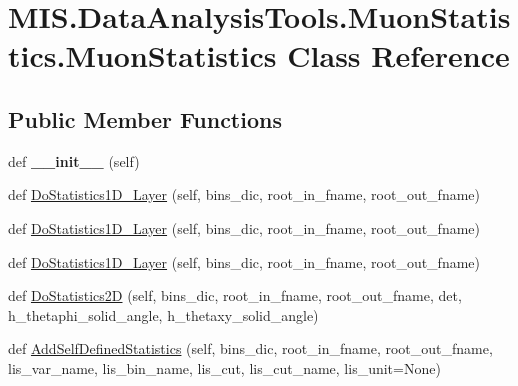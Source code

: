 \hypertarget{classMIS_1_1DataAnalysisTools_1_1MuonStatistics_1_1MuonStatistics}{}\section{M\+I\+S.\+Data\+Analysis\+Tools.\+Muon\+Statistics.\+Muon\+Statistics Class Reference}
\label{classMIS_1_1DataAnalysisTools_1_1MuonStatistics_1_1MuonStatistics}
\subsection*{Public Member Functions}
\begin{DoxyCompactItemize}
\item 
\mbox{\label{classMIS_1_1DataAnalysisTools_1_1MuonStatistics_1_1MuonStatistics_ad3efd45157427c80cd90b920bdd639da}} 
def {\bfseries \+\_\+\+\_\+init\+\_\+\+\_\+} (self)
\item 
def \hyperlink{classMIS_1_1DataAnalysisTools_1_1MuonStatistics_1_1MuonStatistics_abd0a8cd462c3b97c491529d113254d4d}{Do\+Statistics1\+D\+\_\+Layer} (self, bins\+\_\+dic, root\+\_\+in\+\_\+fname, root\+\_\+out\+\_\+fname)
\item 
def \hyperlink{classMIS_1_1DataAnalysisTools_1_1MuonStatistics_1_1MuonStatistics_ac29374f312e07174fdc6483bd686b7ff}{Do\+Statistics1\+D\+\_\+Layer} (self, bins\+\_\+dic, root\+\_\+in\+\_\+fname, root\+\_\+out\+\_\+fname)
\item 
def \hyperlink{classMIS_1_1DataAnalysisTools_1_1MuonStatistics_1_1MuonStatistics_ac06ea60dabb49a569b97e08a18c67ba4}{Do\+Statistics1\+D\+\_\+Layer} (self, bins\+\_\+dic, root\+\_\+in\+\_\+fname, root\+\_\+out\+\_\+fname)
\item 
def \hyperlink{classMIS_1_1DataAnalysisTools_1_1MuonStatistics_1_1MuonStatistics_a5669bb230b1b06cd0900fad517f0e560}{Do\+Statistics2D} (self, bins\+\_\+dic, root\+\_\+in\+\_\+fname, root\+\_\+out\+\_\+fname, det, h\+\_\+thetaphi\+\_\+solid\+\_\+angle, h\+\_\+thetaxy\+\_\+solid\+\_\+angle)
\item 
def \hyperlink{classMIS_1_1DataAnalysisTools_1_1MuonStatistics_1_1MuonStatistics_afb44cdc7159a680ac7f997f4a171a81a}{Add\+Self\+Defined\+Statistics} (self, bins\+\_\+dic, root\+\_\+in\+\_\+fname, root\+\_\+out\+\_\+fname, lis\+\_\+var\+\_\+name, lis\+\_\+bin\+\_\+name, lis\+\_\+cut, lis\+\_\+cut\+\_\+name, lis\+\_\+unit=None)
\end{DoxyCompactItemize}
